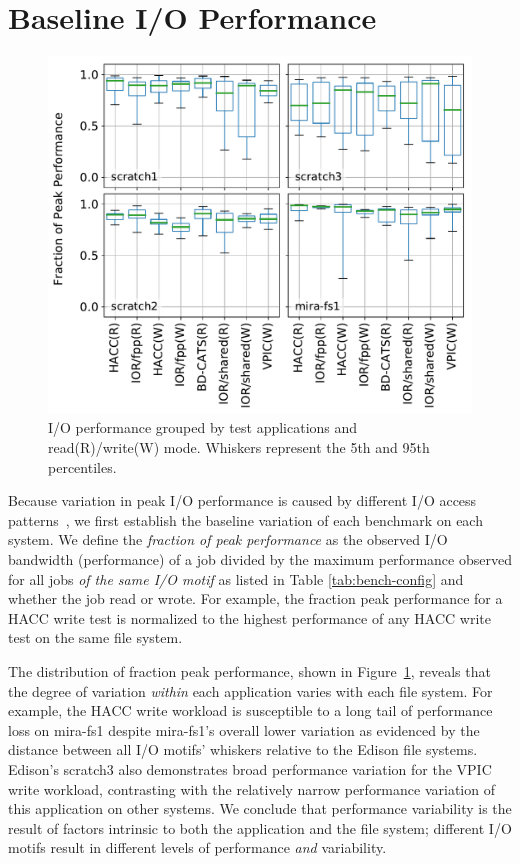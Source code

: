 \section{Baseline I/O Performance} \label{sec:results}

\begin{figure}[t]
    \centering
    \includegraphics[width=1.0\columnwidth]{figs/perf-boxplots.pdf}
    \vspace{-.25in}
    \caption{I/O performance grouped by test applications and read(R)/write(W) mode.  Whiskers represent the 5th and 95th percentiles.}
    \label{fig:perf-summary-boxplots-motif}
	\vspace{-.3in}
\end{figure}

Because variation in peak I/O performance is caused by different I/O access patterns~\cite{Lofstead2010,Uselton2010,Xie2012}, we first establish the baseline variation of each benchmark on each system.
We define the \emph{fraction of peak performance} as the observed I/O bandwidth (performance) of a job divided by the maximum performance observed for all jobs \emph{of the same I/O motif} as listed in Table \ref{tab:bench-config} and whether the job read or wrote.
For example, the fraction peak performance for a HACC write test is normalized to the highest performance of any HACC write test on the same file system.

The distribution of fraction peak performance, shown in Figure~\ref{fig:perf-summary-boxplots-motif}, 
reveals that the degree of variation \emph{within} each application varies with each file system.
For example, the HACC write workload is susceptible to a long tail of performance loss on mira-fs1 despite mira-fs1's overall lower variation as evidenced by the distance between all I/O motifs' whiskers relative to the Edison file systems.
Edison's scratch3 also demonstrates broad performance variation for the VPIC write workload, contrasting with the relatively narrow performance variation of this application on other systems.  We conclude that performance variability is the result of factors intrinsic to both the application and the file system;
different I/O motifs result in different levels of performance \emph{and} variability.


